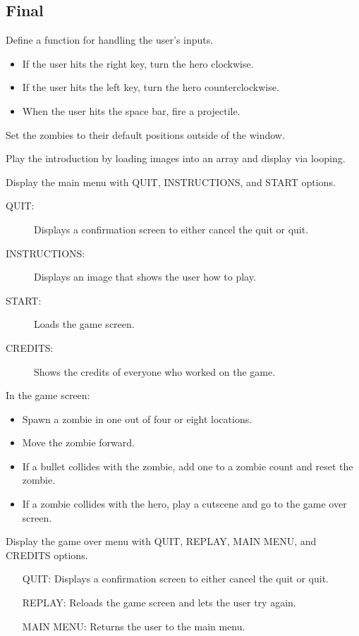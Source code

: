 \documentclass[12pt]{article}
\begin{document}
   \subsection{Final}
   
   \begin{description}
   	\item Define a function for handling the user's inputs.
   		\begin{itemize}
   		\item If the user hits the right key, turn the hero clockwise.
   		\item If the user hits the left key, turn the hero counterclockwise.
   		\item When the user hits the space bar, fire a projectile.
   		\end{itemize}
   	\item Set the zombies to their default positions outside of the window.
   	\item Play the introduction by loading images into an array and display via looping.
   	\item Display the main menu with QUIT, INSTRUCTIONS, and START options.
   		\begin{description}
   		\item[QUIT: ] Displays a confirmation screen to either cancel the quit or quit.
   		\item[INSTRUCTIONS: ] Displays an image that shows the user how to play.
   		\item[START: ] Loads the game screen.
   		\item[CREDITS: ] Shows the credits of everyone who worked on the game.
   		\end{description}
   	\item In the game screen:
   		\begin{itemize}
   		\item Spawn a zombie in one out of four or eight locations.
   		\item Move the zombie forward.
   		\item If a bullet collides with the zombie, add one to a zombie count and reset the zombie.
   		\item If a zombie collides with the hero, play a cutscene and go to the game over screen.
   		\end{itemize}
   	\item Display the game over menu with QUIT, REPLAY, MAIN MENU, and CREDITS options.
   		\begin{itemize}
   		\item[QUIT: ] Displays a confirmation screen to either cancel the quit or quit.
   		\item[REPLAY: ] Reloads the game screen and lets the user try again.
   		\item[MAIN MENU: ] Returns the user to the main menu.
   		\end{itemize}
   \end{description}
    \rm\mc 
\end{document}
